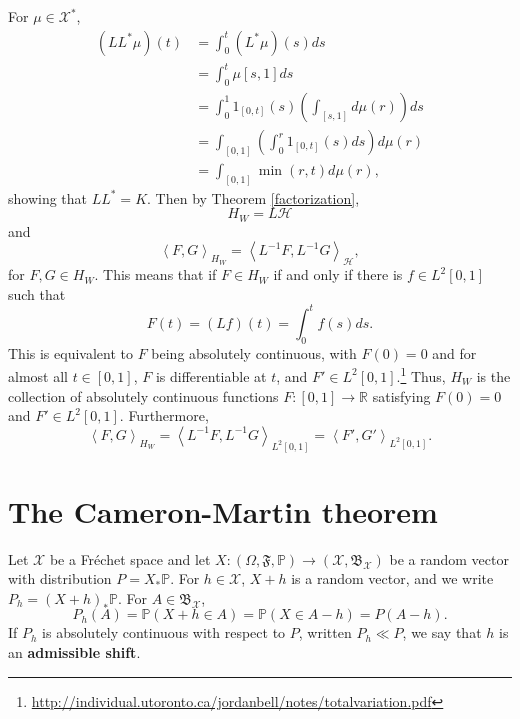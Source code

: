 \documentclass{article}
\newcommand{\inner}[2]{\left\langle #1, #2 \right\rangle}
\theoremstyle{definition}
\begin{document}
For $\mu \in \mathscr{X}^*$,
\begin{align*}
(LL^*\mu)(t) &= \int_0^t (L^*\mu)(s) ds\\
&=\int_0^t \mu[s,1] ds\\
&=\int_0^1 1_{[0,t]}(s) \left( \int_{[s,1]} d\mu(r) \right) ds\\
&=\int_{[0,1]}  \left( \int_0^r  1_{[0,t]}(s) ds \right) d\mu(r)\\
&=\int_{[0,1]} \min(r,t) d\mu(r),
\end{align*}
showing that $LL^*=K$. 
Then by Theorem \ref{factorization},
\[
H_W = L\mathscr{H}
\]
and
\[
\inner{F}{G}_{H_W} = \inner{L^{-1}F}{L^{-1}G}_{\mathscr{H}},
\]
for $F,G \in H_W$. This means that if $F \in H_W$ if and only if there is $f \in L^2[0,1]$ such that
\[
F(t) = (Lf)(t) = \int_0^t f(s) ds.
\]
This is equivalent to $F$ being absolutely continuous, with $F(0)=0$ and for almost all $t \in [0,1]$, $F$ is differentiable at $t$, and
$F' \in L^2[0,1]$.\footnote{\url{http://individual.utoronto.ca/jordanbell/notes/totalvariation.pdf}} 
Thus, $H_W$ is the collection of absolutely continuous functions $F:[0,1] \to \mathbb{R}$ satisfying $F(0)=0$ and $F' \in L^2[0,1]$. 
Furthermore,
\[
\inner{F}{G}_{H_W} = \inner{L^{-1}F}{L^{-1}G}_{L^2[0,1]} = \inner{F'}{G'}_{L^2[0,1]}.
\]



\section{The Cameron-Martin theorem}
Let $\mathscr{X}$ be a Fr\'echet space and let
$X:(\Omega,\mathfrak{F},\mathbb{P}) \to (\mathscr{X},\mathfrak{B}_{\mathscr{X}})$ be a random vector with distribution
$P=X_*\mathbb{P}$. 
For $h \in \mathscr{X}$, $X+h$ is a random vector, and we write $P_h=(X+h)_*\mathbb{P}$. For $A \in \mathfrak{B}_{\mathscr{X}}$,
\[
P_h(A) = \mathbb{P}(X+h \in A) = \mathbb{P}(X \in A-h) = P(A-h).
\]
If $P_h$ is absolutely continuous with respect to $P$, written
$P_h \ll P$, we say that $h$ is an \textbf{admissible shift}. 
\end{document}

